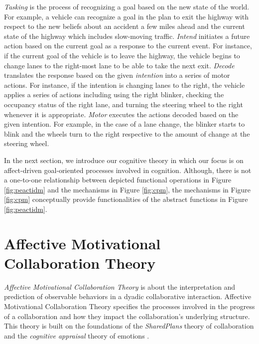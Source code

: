 \documentclass[journal, 11pt]{IEEEtran}
\begin{document}
\textit{Tasking} is the process of recognizing a goal based on the new state of
the world. For example, a vehicle can recognize a goal in the plan to exit the
highway with respect to the new beliefs about an accident a few miles ahead and
the current state of the highway which includes slow-moving traffic.
\textit{Intend} initiates a future action based on the current goal as a
response to the current event. For instance, if the current goal of the vehicle
is to leave the highway, the vehicle begins to change lanes to the right-most
lane to be able to take the next exit. \textit{Decode} translates the response
based on the given \textit{intention} into a series of motor actions. For
instance, if the intention is changing lanes to the right, the vehicle applies a
series of actions including using the right blinker, checking the occupancy
status of the right lane, and turning the steering wheel to the right whenever
it is appropriate. \textit{Motor} executes the actions decoded based on the
given intention. For example, in the case of a lane change, the blinker starts
to blink and the wheels turn to the right respective to the amount of change at
the steering wheel.

{\color{red} In the next section, we introduce our cognitive theory in which our
focus is on affect-driven goal-oriented processes involved in cognition.
Although, there is not a one-to-one relationship between depicted functional
operations in Figure \ref{fig:peactidm} and the mechanisms in Figure
\ref{fig:cpm}, the mechanisms in Figure \ref{fig:cpm} conceptually provide
functionalities of the abstract functions in Figure \ref{fig:peactidm}.}

\section{{\fontsize{11.5}{9}\selectfont Affective Motivational Collaboration
Theory}}
\label{sec:amct}

\textit{Affective Motivational Collaboration Theory}
\cite{shayganfar:theory-overview} is about the interpretation and prediction of
observable behaviors in a dyadic collaborative interaction. Affective
Motivational Collaboration Theory specifies the processes involved in the
progress of a collaboration and how they impact the collaboration's underlying
structure. This theory is built on the foundations of the \textit{SharedPlans}
theory of collaboration \cite{grosz:plans-discourse} and the \textit{cognitive
appraisal} theory of emotions \cite{gratch:domain-independent}.
\end{document}
